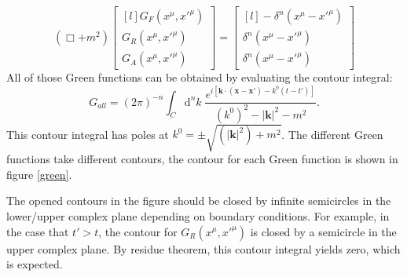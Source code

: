 \documentclass[12pt]{article}
\numberwithin{equation}{section}
\theoremstyle{1style}
\newcommand{\id}{\mathrm{d}}
\begin{document}
\begin{equation}
  (\Box+m^2)
  \begin{bmatrix*}[l]
    G_{F}(x^{\mu},x'^{\mu})\\
    G_{R}(x^{\mu},x'^{\mu})\\
    G_{A}(x^{\mu},x'^{\mu})
  \end{bmatrix*}
  =
  \begin{bmatrix*}[l]
    -\delta^n(x^{\mu}-x'^{\mu})\\
    \delta^n(x^{\mu}-x'^{\mu})\\
    \delta^n(x^{\mu}-x'^{\mu})
  \end{bmatrix*}
\end{equation}
All of those Green functions can be obtained by evaluating the contour integral:
\begin{equation}\label{greenContour}
  G_{all}=(2\pi)^{-n}\int_{C}\id^nk\;\frac{e^{i\left[\mathbf{k}\cdot(\mathbf{x}-\mathbf{x'})-k^0(t-t')\right]}}{(k^0)^2-|\mathbf{k}|^2-m^2}.
\end{equation}
This contour integral has poles at \(k^0=\pm \sqrt{(|\mathbf{k}|^2)+m^2}\).
The different Green functions take different contours, the contour for each Green function is shown in figure \ref{green}.

The opened contours in the figure should be closed by infinite semicircles in the lower/upper complex plane depending on boundary conditions.
For example, in the case that \(t'>t\), the contour for \(G_{R}(x^{\mu},x'^{\mu})\) is closed by a semicircle in the upper complex plane.
By residue theorem, this contour integral yields zero, which is expected.
\end{document}
